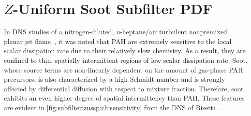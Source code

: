 \section{\texorpdfstring{$Z$}{Z}-Uniform Soot Subfilter PDF}
\label{sec:subfilter:zussp}


In DNS studies of a nitrogen-diluted, \textit{n}-heptane/air turbulent nonpremixed planar jet flame~\cite{bisetti2012,attili2014,attili2015}, it was noted that PAH are extremely sensitive to the local scalar dissipation rate due to their relatively slow chemistry. As a result, they are confined to thin, spatially intermittent regions of low scalar dissipation rate. Soot, whose source terms are non-linearly dependent on the amount of gas-phase PAH precursors, is also characterized by a high Schmidt number and is strongly affected by differential diffusion with respect to mixture fraction. Therefore, soot exhibits an even higher degree of spatial intermittency than PAH. These features are evident in \cref{fig:subfilter:zussp:chisensitivity} from the DNS of Bisetti \etal~\cite{bisetti2012}.

